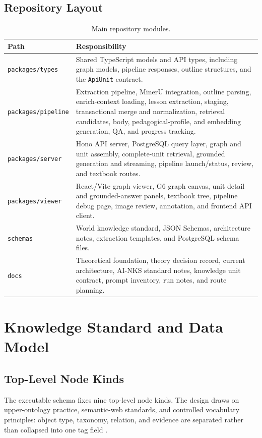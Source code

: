 \documentclass[11pt,letterpaper]{article}
\newcommand{\code}[1]{\nolinkurl{#1}}
\begin{document}
\subsection{Repository Layout}

\begin{table}[H]
\centering
\small
\begin{tabularx}{\textwidth}{@{}lY@{}}
\toprule
\textbf{Path} & \textbf{Responsibility}\\
\midrule
\code{packages/types} & Shared TypeScript models and API types, including graph models, pipeline responses, outline structures, and the \code{ApiUnit} contract.\\
\code{packages/pipeline} & Extraction pipeline, MinerU integration, outline parsing, enrich-context loading, lesson extraction, staging, transactional merge and normalization, retrieval candidates, body, pedagogical-profile, and embedding generation, QA, and progress tracking.\\
\code{packages/server} & Hono API server, PostgreSQL query layer, graph and unit assembly, complete-unit retrieval, grounded generation and streaming, pipeline launch/status, review, and textbook routes.\\
\code{packages/viewer} & React/Vite graph viewer, G6 graph canvas, unit detail and grounded-answer panels, textbook tree, pipeline debug page, image review, annotation, and frontend API client.\\
\code{schemas} & World knowledge standard, JSON Schemas, architecture notes, extraction templates, and PostgreSQL schema files.\\
\code{docs} & Theoretical foundation, theory decision record, current architecture, AI-NKS standard notes, knowledge unit contract, prompt inventory, run notes, and route planning.\\
\bottomrule
\end{tabularx}
\caption{Main repository modules.}
\end{table}

\section{Knowledge Standard and Data Model}

\subsection{Top-Level Node Kinds}

The executable schema fixes nine top-level node kinds. The design draws on upper-ontology practice, semantic-web standards, and controlled vocabulary principles: object type, taxonomy, relation, and evidence are separated rather than collapsed into one tag field \cite{bfo,owl,skos,hogan-kg}.
\end{document}
